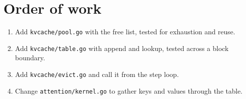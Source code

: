 \section{Order of work}
\begin{enumerate}
\item Add \verb|kvcache/pool.go| with the free list, tested for exhaustion and reuse.
\item Add \verb|kvcache/table.go| with append and lookup, tested across a block boundary.
\item Add \verb|kvcache/evict.go| and call it from the step loop.
\item Change \verb|attention/kernel.go| to gather keys and values through the table.
\end{enumerate}
